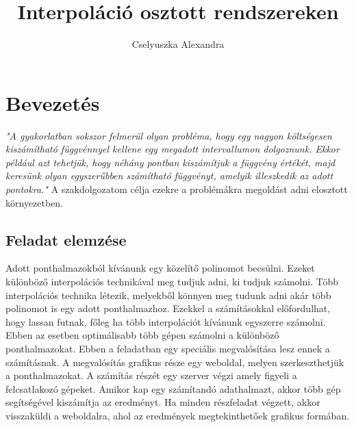 \documentclass{elteikthesis}
\title{Interpoláció osztott rendszereken}
\author{Cselyuszka Alexandra}
\begin{document}
\frontmatter

	\maketitle

\mainmatter

\tableofcontents
	
\chapter{Bevezetés} 

	\textit{"A gyakorlatban sokszor felmerül olyan probléma, hogy egy nagyon költségesen kiszámítható függvénnyel kellene egy megadott intervallumon dolgoznunk. Ekkor például azt tehetjük, hogy néhány pontban kiszámítjuk a függvény értékét, majd keresünk olyan egyszerűbben számítható függvényt, amelyik illeszkedik az adott pontokra."}\cite{numanalbev}
	\newline
	\newline
	A szakdolgozatom célja ezekre a problémákra megoldást adni elosztott környezetben. 
	\section{Feladat elemzése}
	Adott ponthalmazokból kívánunk egy közelítő polinomot becsülni. Ezeket különböző interpolációs technikával meg tudjuk adni, ki tudjuk számolni. Több interpolációs technika létezik, melyekből könnyen meg tudunk adni akár több polinomot is egy adott ponthalmazhoz.\newline
	Ezekkel a számításokkal előfordulhat, hogy lassan futnak, főleg ha több interpolációt kívánunk egyszerre számolni.
	Ebben az esetben optimálisabb több gépen számolni a különböző ponthalmazokat.
	\newline\newline
	Ebben a feladatban egy speciális megvalósítása lesz ennek a számításnak. 
	\newline
	A megvalósítás grafikus része egy weboldal, melyen szerkeszthetjük a ponthalmazokat. A számítás részét egy szerver végzi amely figyeli a felcsatlakozó gépeket. Amikor kap egy számítandó adathalmazt, akkor több gép segítségével kiszámítja az eredményt. Ha minden részfeladat végzett, akkor visszaküldi a weboldalra, ahol az eredmények megtekinthetőek grafikus formában.
	\newline\newline
\end{document}

